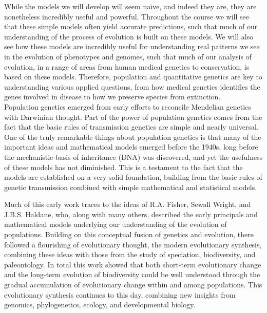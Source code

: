 
While the models we will develop will seem na\"{\i}ve, and indeed they are, they are
nonetheless incredibly useful and powerful. Throughout the course we will see
that these simple models often yield accurate predictions, such that much of our
understanding of the process of evolution is built on these models. We will
also see how these models are incredibly useful for understanding real patterns
we see in the evolution of phenotypes and genomes, such that much of our
analysis of evolution, in a range of areas from human medical genetics to conservation,
is based on these models. Therefore, population and quantitative genetics are key to
understanding various applied questions, from how medical genetics identifies
the genes involved in disease to how we preserve species from extinction. \\

Population genetics emerged from early efforts to
reconcile Mendelian genetics with Darwinian thought.
Part of the power of
population genetics comes from the fact that the basic rules of
transmission genetics are simple and nearly universal.  One of the truly remarkable things about population genetics is that
many of the important ideas and mathematical models emerged before the
1940s, long before the
mechanistic-basis of inheritance (DNA) was discovered, and yet the
usefulness of these models has not diminished. This is a testament to
the fact that the models are established on a very solid foundation,
building from the basic rules of genetic transmission combined with
simple mathematical and statistical models.   

Much of this early work traces to the ideas of R.A. Fisher, Sewall Wright, and J.B.S. Haldane, who, along with many others, described the early principals and mathematical models underlying our understanding of the evolution of populations. Building on this conceptual fusion of genetics and evolution, there followed a flourishing of evolutionary thought, the modern evolutionary synthesis, combining these ideas with those from the study of speciation, biodiversity, and paleontology. In total this work showed that both short-term evolutionary change and the long-term evolution of biodiversity could be well understood through the gradual accumulation of evolutionary change within and among populations. This evolutionary synthesis continues to this day, combining new insights from genomics, phylogenetics, ecology, and developmental biology.

